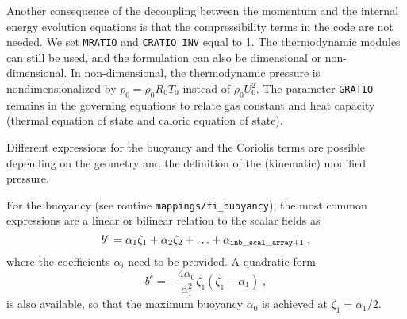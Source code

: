 Another consequence of the decoupling between the momentum and the internal energy evolution equations is that the compressibility terms in the code are not needed. We set \texttt{MRATIO} and \texttt{CRATIO\_INV} equal to 1. The thermodynamic modules can still be used, and the formulation can also be dimensional or non-dimensional. In non-dimensional, the thermodynamic pressure is nondimensionalized by $p_0=\rho_0R_0T_0$ instead of $\rho_0U_0^2$. The parameter \texttt{GRATIO} remains in the governing equations to relate gas constant and heat capacity (thermal equation of state and caloric equation of state).

Different expressions for the buoyancy and the Coriolis terms are possible depending on the geometry and the definition of the (kinematic) modified pressure.

For the buoyancy (see routine {\tt mappings/fi\_buoyancy}), the most common expressions are a linear or bilinear relation to the scalar fields as
\begin{equation}
  b^e=\alpha_1\zeta_1+\alpha_2\zeta_2+\ldots+\alpha_\mathrm{\tt inb\_scal\_array+1}\;,
\end{equation}
where the coefficients $\alpha_i$ need to be provided. A quadratic form
\begin{equation}
  b^e=-\frac{4\alpha_0}{\alpha_1^2}\zeta_1(\zeta_1-\alpha_1) \;,
\end{equation}
is also available, so that the maximum buoyancy $\alpha_0$ is achieved at
$\zeta_1=\alpha_1/2$.


